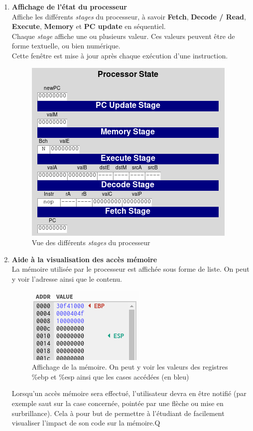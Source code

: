 \documentclass[french]{article}
\newcommand{\itembf}[1]{\item \textbf{#1}\\}
\begin{document}
\begin{enumerate}
\begin{enumerate}
            \itembf{Affichage de l'état du processeur}
            Affiche les différents \textit{stages} du processeur, à savoir \textbf{Fetch}, \textbf{Decode / Read}, \textbf{Execute}, \textbf{Memory} et \textbf{PC update} en séquentiel.\\
            Chaque \textit{stage} affiche une ou plusieurs valeur. Ces valeurs peuvent être de forme textuelle, ou bien numérique.\\
            Cette fenêtre est mise à jour après chaque exécution d'une instruction.
            \begin{figure}[H]
                \centering
                \includegraphics{img/ex_statut_proc.png}
                \caption{Vue des différents \textit{stages} du processeur}
                \label{fig:ex_statut_proc}
            \end{figure}
            
            \itembf{Aide à la visualisation des accès mémoire}
            La mémoire utilisée par le processeur est affichée sous forme de liste. On peut y voir l'adresse ainsi que le contenu.
            \begin{figure}[H]
                \centering
                \includegraphics{img/ex_memoire.png}
                \caption{Affichage de la mémoire. On peut y voir les valeurs des registres \%ebp et \%esp ainsi que les cases accédées (en bleu)}
                \label{fig:ex_memoire}
            \end{figure}
            Lorsqu'un accès mémoire sera effectué, l'utilisateur devra en être notifié (par exemple saut sur la case concernée, pointée par une flèche ou mise en surbrillance). Cela à pour but de permettre à l'étudiant de facilement visualiser l'impact de son code sur la mémoire.Q
    \end{enumerate}{}


\end{enumerate}
\end{document}

